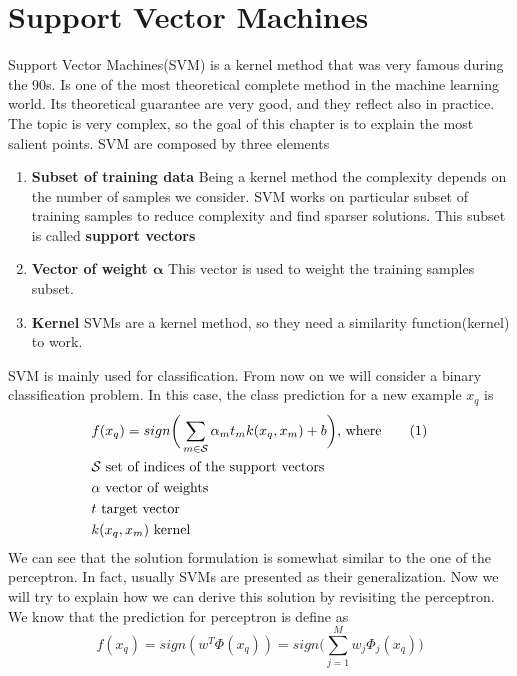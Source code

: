 \documentclass[main.tex]{subfiles}
\newcommand\numberthis{\addtocounter{equation}{1}\tag{\theequation}}
\begin{document}
\section{Support Vector Machines}
Support Vector Machines(SVM) is a kernel method that was very famous during the 90s. Is one of the most theoretical complete method in the machine learning world. Its theoretical guarantee are very good, and they reflect also in practice. The topic is very complex, so the goal of this chapter is to explain the most salient points.
SVM are composed by three elements
\begin{enumerate}
    \item \textbf{Subset of training data} Being a kernel method the complexity depends on the number of samples we consider. SVM works on particular subset of training samples to reduce complexity and find sparser solutions. This subset is called \textbf{support vectors}
    \item \textbf{Vector of weight $\boldsymbol{\alpha}$} This vector is used to weight the training samples subset.
    \item \textbf{Kernel} SVMs are a kernel method, so they need a similarity function(kernel) to work.
\end{enumerate}
SVM is mainly used for classification. From now on we will consider a binary classification problem. In this case, the class prediction for a new example $x_q$ is
\begin{align*}
     & f(x_q) = sign\bigg( \sum_{m \in \mathcal{S}} \alpha_m t_m k(x_q,x_m) + b \bigg) \text{, where} \numberthis \\
     & \mathcal{S} \text{ set of indices of the support vectors}                                                  \\
     & \alpha \text{ vector of weights}                                                                           \\
     & t \text{ target vector}                                                                                    \\
     & k(x_q,x_m) \text{ kernel}
\end{align*}
We can see that the solution formulation is somewhat similar to the one of the perceptron. In fact, usually SVMs are presented as their generalization. Now we will try to explain how we can derive this solution by revisiting the perceptron.
We know that the prediction for perceptron is define as
\begin{equation*}
    f(x_q) = sign(w^T \Phi(x_q)) = sign \bigg(\sum_{j=1}^M w_j \Phi_j(x_q) \bigg)
\end{equation*}
\end{document}
